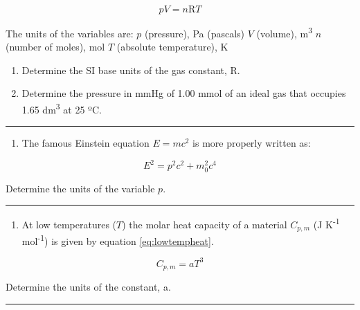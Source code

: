 \documentclass[
]{book}
\providecommand{\tightlist}{%
  \setlength{\itemsep}{0pt}\setlength{\parskip}{0pt}}
\begin{document}
\begin{equation}
pV = n\textrm{R}T
\label{eq:idealgas}
\end{equation}

The units of the variables are:
\(p\) (pressure), Pa (pascals)
\(V\) (volume), m\textsuperscript{3}
\(n\) (number of moles), mol
\(T\) (absolute temperature), K

\begin{enumerate}
\def\labelenumi{\alph{enumi}.}
\item
  Determine the SI base units of the gas constant, R.
\item
  Determine the pressure in mmHg of 1.00 mmol of an ideal gas that occupies 1.65 dm\textsuperscript{3} at 25 ºC.
\end{enumerate}

\begin{center}\rule{0.5\linewidth}{0.5pt}\end{center}

\begin{enumerate}
\def\labelenumi{\arabic{enumi}.}
\setcounter{enumi}{1}
\tightlist
\item
  The famous Einstein equation \(E=mc^2\) is more properly written as:
\end{enumerate}

\begin{equation*}
E^2 = p^2 c^2 + m_0^2 c^4
\end{equation*}

Determine the units of the variable \(p\).

\begin{center}\rule{0.5\linewidth}{0.5pt}\end{center}

\begin{enumerate}
\def\labelenumi{\arabic{enumi}.}
\setcounter{enumi}{2}
\tightlist
\item
  At low temperatures (\(T\)) the molar heat capacity of a material \(C_{p, m}\) (J K\textsuperscript{-1} mol\textsuperscript{-1}) is given by equation \eqref{eq:lowtempheat}.
\end{enumerate}

\begin{equation}
C_{p, m}= a T^3
\label{eq:lowtempheat}
\end{equation}

Determine the units of the constant, a.

\begin{center}\rule{0.5\linewidth}{0.5pt}\end{center}
\end{document}

